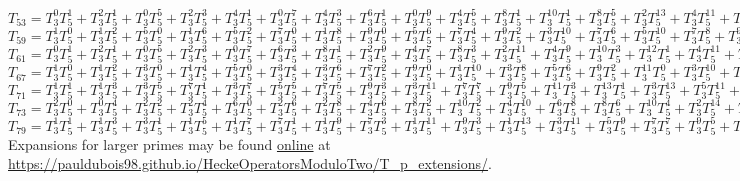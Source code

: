 $T_{53} = T_3^{0}T_5^{1} + T_3^{2}T_5^{1} + T_3^{0}T_5^{5} + T_3^{2}T_5^{3} + T_3^{4}T_5^{1} + T_3^{0}T_5^{7} + T_3^{4}T_5^{3} + T_3^{6}T_5^{1} + T_3^{0}T_5^{9} + T_3^{4}T_5^{5} + T_3^{8}T_5^{1} + T_3^{10}T_5^{1} + T_3^{8}T_5^{5} + T_3^{2}T_5^{13} + T_3^{4}T_5^{11} + T_3^{6}T_5^{9} + T_3^{10}T_5^{5} + T_3^{14}T_5^{1} + T_3^{2}T_5^{15} + T_3^{4}T_5^{13} + T_3^{6}T_5^{11} + T_3^{14}T_5^{3} + T_3^{16}T_5^{1} + \dots $\\   
$T_{59} = T_3^{1}T_5^{0} + T_3^{1}T_5^{2} + T_3^{5}T_5^{0} + T_3^{1}T_5^{6} + T_3^{5}T_5^{2} + T_3^{7}T_5^{0} + T_3^{1}T_5^{8} + T_3^{9}T_5^{0} + T_3^{5}T_5^{6} + T_3^{7}T_5^{4} + T_3^{9}T_5^{2} + T_3^{3}T_5^{10} + T_3^{7}T_5^{6} + T_3^{5}T_5^{10} + T_3^{7}T_5^{8} + T_3^{9}T_5^{6} 
+ T_3^{9}T_5^{8} + T_3^{11}T_5^{6} + \dots $\\
$T_{61} = T_3^{0}T_5^{1} + T_3^{2}T_5^{1} + T_3^{0}T_5^{5} + T_3^{2}T_5^{3} + T_3^{0}T_5^{7} + T_3^{6}T_5^{3} + T_3^{8}T_5^{1} + T_3^{2}T_5^{9} + T_3^{4}T_5^{7} + T_3^{8}T_5^{3} + T_3^{2}T_5^{11} + T_3^{4}T_5^{9} + T_3^{10}T_5^{3} + T_3^{12}T_5^{1} + T_3^{4}T_5^{11} + T_3^{6}T_5^{9} + T_3^{12}T_5^{3} + T_3^{4}T_5^{13} + T_3^{6}T_5^{11} + T_3^{8}T_5^{9} + \dots $\\
$T_{67} = T_3^{1}T_5^{0} + T_3^{1}T_5^{2} + T_3^{3}T_5^{0} + T_3^{1}T_5^{4} + T_3^{5}T_5^{0} + T_3^{3}T_5^{4} + T_3^{3}T_5^{6} + T_3^{7}T_5^{2} + T_3^{9}T_5^{0} + T_3^{1}T_5^{10} + T_3^{3}T_5^{8} + T_3^{5}T_5^{6} + T_3^{9}T_5^{2} + T_3^{11}T_5^{0} + T_3^{3}T_5^{10} + T_3^{5}T_5^{8} + T_3^{7}T_5^{6} + T_3^{9}T_5^{4} + T_3^{1}T_5^{14} + T_3^{3}T_5^{12} + T_3^{5}T_5^{10} + T_3^{7}T_5^{8} + T_3^{9}T_5^{6} + T_3^{5}T_5^{12} 
+ T_3^{9}T_5^{8} + T_3^{11}T_5^{6} + T_3^{13}T_5^{4} + T_3^{15}T_5^{2} + \dots $\\
$T_{71} = T_3^{1}T_5^{1} + T_3^{1}T_5^{3} + T_3^{3}T_5^{5} + T_3^{7}T_5^{1} + T_3^{3}T_5^{7} + T_3^{5}T_5^{5} + T_3^{7}T_5^{5} + T_3^{9}T_5^{3} + T_3^{3}T_5^{11} + T_3^{7}T_5^{7} + T_3^{9}T_5^{5} + T_3^{11}T_5^{3} + T_3^{13}T_5^{1} + T_3^{3}T_5^{13} + T_3^{5}T_5^{11} + T_3^{9}T_5^{7} + T_3^{11}T_5^{5} + T_3^{13}T_5^{3} + T_3^{15}T_5^{1} + T_3^{7}T_5^{11} + T_3^{13}T_5^{5} + \dots $\\
$T_{73} = T_3^{2}T_5^{0} + T_3^{0}T_5^{4} + T_3^{2}T_5^{2} + T_3^{2}T_5^{4} + T_3^{6}T_5^{0} + T_3^{2}T_5^{6} + T_3^{2}T_5^{8} + T_3^{4}T_5^{6} + T_3^{8}T_5^{2} + T_3^{10}T_5^{2} + T_3^{4}T_5^{10} + T_3^{6}T_5^{8} + T_3^{8}T_5^{6} + T_3^{10}T_5^{4} + T_3^{2}T_5^{14} + T_3^{8}T_5^{8} + T_3^{10}T_5^{6} + T_3^{10}T_5^{8} + T_3^{16}T_5^{2} + \dots $\\
$T_{79} = T_3^{1}T_5^{1} + T_3^{1}T_5^{3} + T_3^{3}T_5^{1} + T_3^{1}T_5^{5} + T_3^{1}T_5^{7} + T_3^{7}T_5^{1} + T_3^{1}T_5^{9} + T_3^{7}T_5^{3} + T_3^{1}T_5^{11} + T_3^{9}T_5^{3} + T_3^{1}T_5^{13} + T_3^{3}T_5^{11} + T_3^{5}T_5^{9} + T_3^{7}T_5^{7} + T_3^{9}T_5^{5} + T_3^{11}T_5^{3} + T_3^{3}T_5^{13} + T_3^{7}T_5^{9} + T_3^{11}T_5^{5} + T_3^{15}T_5^{1} + T_3^{3}T_5^{15} + T_3^{5}T_5^{13} + T_3^{9}T_5^{9} + T_3^{11}T_5^{7} + \dots $\\
Expansions for larger primes may be found \href{https://pauldubois98.github.io/HeckeOperatorsModuloTwo/T_p_extensions/}{online} at \url{https://pauldubois98.github.io/HeckeOperatorsModuloTwo/T_p_extensions/}.


